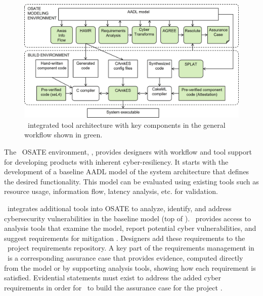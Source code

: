 \begin{figure}
	\begin{center}
	  \includegraphics[width=\textwidth]{./figs/tool-arch.jpg}
  	\end{center}
	\caption{\brfcs\ integrated tool architecture with key components in the general workflow shown in green.} 
	\label{fig:tool-arch} 
\end{figure}

The \brfcs\ OSATE environment, , provides designers with workflow and tool support for developing products with inherent cyber-resiliency.
It starts with the development of a baseline AADL model of the system architecture that defines the desired functionality.
This model can be evaluated using existing tools such as resource usage, information flow, latency analysis, etc. for validation.

\brfcs\ integrates additional tools into OSATE to analyze, identify, and address cybersecurity vulnerabilities in the baseline model (top of ).
\brfcs\ provides access to analysis tools that examine the model, report potential cyber vulnerabilities,
and suggest requirements for mitigation \cite{dcrypps2019,gearcase2020}.
Designers add these requirements to the \brfcs\ project requirements repository. 
A key part of the requirements management in \brfcs\ is a corresponding assurance case that provides evidence, computed directly from the model or by supporting analysis tools, showing how each requirement is satisfied.
Evidential statements must exist to address the added cyber requirements in order for \brfcs\ to build the assurance case for the project \cite{resolute-destion}.

